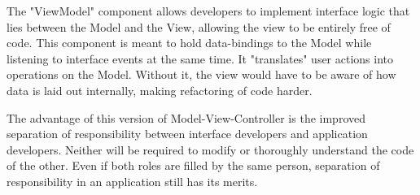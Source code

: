 \documentclass[thesis.tex]{subfiles}
\begin{document}
The "ViewModel" component allows developers to implement interface logic that
lies between the Model and the View, allowing the view to be entirely free
of code. This component is meant to hold data-bindings to the Model while
listening to interface events at the same time. It "translates" user actions
into operations on the Model. Without it, the view would have to be aware of how
data is laid out internally, making refactoring of code harder.

The advantage of this version of Model-View-Controller is the improved
separation of responsibility between interface developers and application
developers. Neither will be required to modify or thoroughly understand the code
of the other. Even if both roles are filled by the same person,
separation of responsibility in an application still has its merits.

\end{document}
